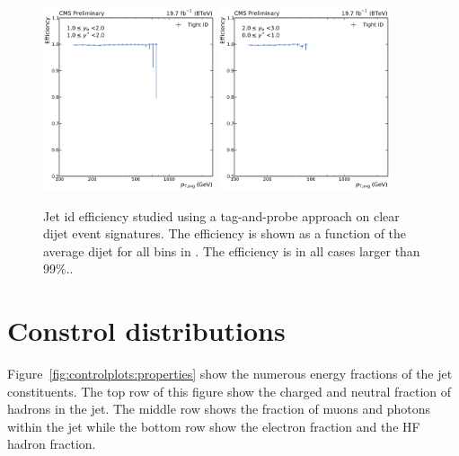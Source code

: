 \begin{figure}[htbp]
    \includegraphics[width=0.45\textwidth]{figures/measurement/jetideff_yb1ys1.pdf}\hfill
    \includegraphics[width=0.45\textwidth]{figures/measurement/jetideff_yb2ys0.pdf}
    \caption{Jet id efficiency studied using a tag-and-probe approach on clear dijet event signatures. The efficiency
    is shown as a function of the average dijet \pt for all bins in \ystar \yboost. The efficiency is in all cases larger
    than 99\%..}
    \label{fig:jetid_eff}
\end{figure}

\section{Constrol distributions}

Figure~\ref{fig:controlplots:properties} show the numerous energy fractions of the jet constituents. The top
row of this figure show the charged and neutral fraction of hadrons in the jet. The middle row shows
the fraction of muons and photons within the jet while the bottom row show the electron fraction and
the HF hadron fraction.


